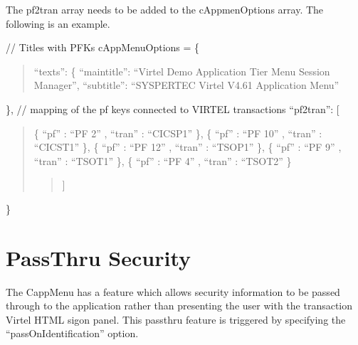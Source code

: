 \documentclass[letterpaper,10pt,english]{sphinxmanual}
\begin{document}
\sphinxAtStartPar
The pf2tran array needs to be added to the cAppmenOptions array. The following is an example.
\begin{description}
\sphinxlineitem{::}
\sphinxAtStartPar
// Titles with PFKs
cAppMenuOptions = \{
\begin{quote}

\sphinxAtStartPar
“texts”: \{
“main\sphinxhyphen{}title”: “Virtel Demo Application Tier Menu Session Manager”,
“sub\sphinxhyphen{}title”: “SYSPERTEC Virtel V4.61 Application Menu”
\end{quote}

\sphinxAtStartPar
\},
// mapping of the pf keys connected to VIRTEL transactions
“pf2tran”: {[}
\begin{quote}

\sphinxAtStartPar
\{ “pf”  : “PF 2”     ,  “tran” : “CICSP1”         \},
\{ “pf”  : “PF 10”    ,  “tran” : “CICST1”         \},
\{ “pf”  : “PF 12”    ,  “tran” : “TSOP1”          \},
\{ “pf”  : “PF 9”     ,  “tran” : “TSOT1”          \},
\{ “pf”  : “PF 4”     ,  “tran” : “TSOT2”          \}
\begin{quote}

\sphinxAtStartPar
{]}
\end{quote}
\end{quote}

\sphinxAtStartPar
\}

\end{description}


\section{PassThru Security}
\label{\detokenize{Customization:passthru-security}}
\sphinxAtStartPar
The CappMenu has a feature which allows security information to be passed through to the application rather than presenting the user with the transaction Virtel HTML sigon panel. This passthru feature is triggered by specifying the “passOnIdentification” option.

\begin{sphinxVerbatim}[commandchars=\\\{\}]
   
   
   
\end{sphinxVerbatim}
\end{document}
